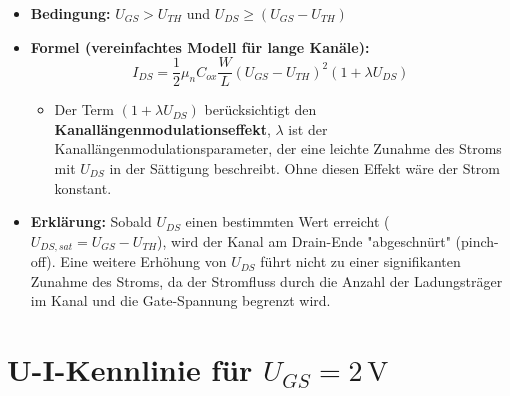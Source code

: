 \documentclass[oneside]{scrarticle}
\numberwithin{equation}{section}
\begin{document}
\begin{itemize}
	\item \textbf{Bedingung:} $U_{GS} > U_{TH}$ und $U_{DS} \ge (U_{GS} - U_{TH})$
	\item \textbf{Formel (vereinfachtes Modell für lange Kanäle):}
	\begin{equation*}
		I_{DS} = \frac{1}{2} \mu_n C_{ox} \frac{W}{L} (U_{GS} - U_{TH})^2 \left( 1 + \lambda U_{DS} \right)
	\end{equation*}
	\begin{itemize}
		\item Der Term $(1 + \lambda U_{DS})$ berücksichtigt den \textbf{Kanallängenmodulationseffekt}, $\lambda$ ist der Kanallängenmodulationsparameter, der eine leichte Zunahme des Stroms mit $U_{DS}$ in der Sättigung beschreibt. Ohne diesen Effekt wäre der Strom konstant.
	\end{itemize}
	\item \textbf{Erklärung:} Sobald $U_{DS}$ einen bestimmten Wert erreicht ($U_{DS,sat} = U_{GS} - U_{TH}$), wird der Kanal am Drain-Ende "abgeschnürt" (pinch-off). Eine weitere Erhöhung von $U_{DS}$ führt nicht zu einer signifikanten Zunahme des Stroms, da der Stromfluss durch die Anzahl der Ladungsträger im Kanal und die Gate-Spannung begrenzt wird.
\end{itemize}

\section{U-I-Kennlinie für $U_{GS} = 2\,\mathrm{V}$}
\end{document}
